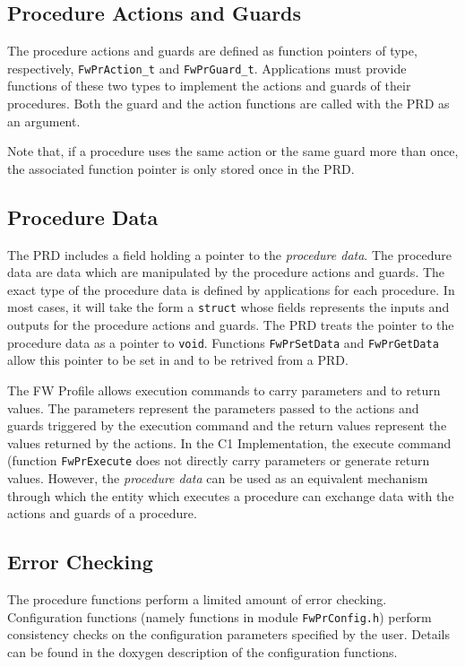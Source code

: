 \documentclass[manual]{../fwprofile}
\begin{document}
\subsection{Procedure Actions and Guards}
The procedure actions and guards are defined as function pointers of type, respectively, \texttt{FwPrAction\_t} 
and \texttt{FwPrGuard\_t}. Applications must provide functions of these two types to implement the actions and 
guards of their procedures. Both the guard and the action functions are called with the PRD as an argument.

Note that, if a procedure uses the same action or the same guard more than once, the associated function 
pointer is only stored once in the PRD. 

\subsection{Procedure Data}\label{sec:prData}
The PRD includes a field holding a pointer to the \emph{procedure data}. The procedure data are data 
which are manipulated by the procedure actions and guards. The exact type of the procedure data is 
defined by applications for each procedure. In most cases, it will take the form a \texttt{struct} whose 
fields represents the inputs and outputs for the procedure actions and guards. The PRD treats the pointer 
to the procedure data as a pointer to \texttt{void}. Functions \texttt{FwPrSetData} and \texttt{FwPrGetData} 
allow this pointer to be set in and to be retrived from a PRD.

The FW Profile allows execution commands to carry parameters and to return values. The parameters represent 
the parameters passed to the actions and guards triggered by the execution command and the return values represent the 
values returned by the actions. In the C1 Implementation, the execute command (function \texttt{FwPrExecute} 
does not directly carry parameters or generate return values. However, the \emph{procedure data} 
can be used as an equivalent mechanism through which the entity which executes a procedure can exchange data with the 
actions and guards of a procedure.

\subsection{Error Checking}\label{sec:prErrorChecking}
The procedure functions perform a limited amount of error checking. Configuration functions (namely functions 
in module \texttt{FwPrConfig.h}) perform consistency checks on the configuration parameters specified by the user. 
Details can be found in the doxygen description of the configuration functions. 
\end{document}
